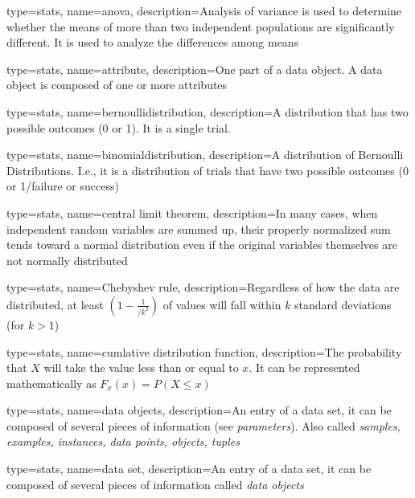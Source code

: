 

{
	type=stats,
    name=anova,
    description={Analysis of variance is used to determine whether the means of more than two independent populations are significantly different.  It is used to analyze the differences among means}
}

{
	type=stats,
    name=attribute,
    description={One part of a data object.  A data object is composed of one or more attributes}
}

{
	type=stats,
    name=bernoullidistribution,
    description={A distribution that has two possible outcomes (0 or 1).  It is a single trial.}
}

{
	type=stats,
    name=binomialdistribution,
    description={A distribution of Bernoulli Distributions.  I.e., it is a distribution of trials that have two possible outcomes (0 or 1/failure or success)}
}

{
	type=stats,
    name=central limit theorem,
    description={In many cases, when independent random variables are summed up, their properly normalized sum tends toward a normal distribution even if the original variables themselves are not normally distributed}
}

{
	type=stats,
    name=Chebyshev rule,
    description={Regardless of how the data are distributed, at least $\left(1-\frac{1}{/k^2}\right)$ of values will fall within $k$ standard deviations (for $k>1$)}
}

{
	type=stats,
    name=cumlative distribution function,
    description={The probability that $X$ will take the value less than or equal to $x$.  It can be represented mathematically as $F_x\left(x\right)=P\left(X\leq{}x\right)$}
}

{
	type=stats,
    name=data objects,
    description={An entry of a data set, it can be composed of several pieces of information (see \textit{parameters}).  Also called \textit{samples, examples, instances, data points, objects, tuples}}
}

{
	type=stats,
    name=data set,
    description={An entry of a data set, it can be composed of several pieces of information called \textit{data objects}}
}

